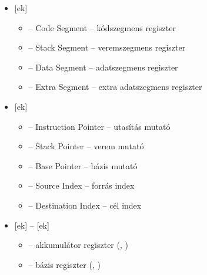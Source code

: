 \documentclass[../main.tex]{subfiles}
\begin{document}
\begin{itemize}
	\item {}[ek]
	      \begin{itemize}
		      \item {} – Code Segment
		            \tabto{4cm} – \tabto{4.6cm}
		            kódszegmens regiszter

		      \item {} – Stack Segment
		            \tabto{4cm} – \tabto{4.6cm}
		            veremszegmens regiszter

		      \item {} – Data Segment
		            \tabto{4cm} – \tabto{4.6cm}
		            adatszegmens regiszter

		      \item {} – Extra Segment
		            \tabto{4cm} – \tabto{4.6cm}
		            extra adatszegmens regiszter
	      \end{itemize}

	\item {}[ek]
	      \begin{itemize}
		      \item {} – Instruction Pointer
		            \tabto{4.8cm} – \tabto{5.4cm}
		            utasítás mutató

		      \item {} – Stack Pointer
		            \tabto{4.8cm} – \tabto{5.4cm}
		            verem mutató

		      \item {} – Base Pointer
		            \tabto{4.8cm} – \tabto{5.4cm}
		            bázis mutató

		      \item {} – Source Index
		            \tabto{4.8cm} – \tabto{5.4cm}
		            forrás index

		      \item {} – Destination Index
		            \tabto{4.8cm} – \tabto{5.4cm}
		            cél index
	      \end{itemize}

	\item {}[ek] -- [ek]
	      \begin{itemize}
		      \item {} – akkumulátor regiszter
		            (, )

		      \item {} – bázis regiszter
		            (, )


\end{itemize}
\end{itemize}
\end{document}
